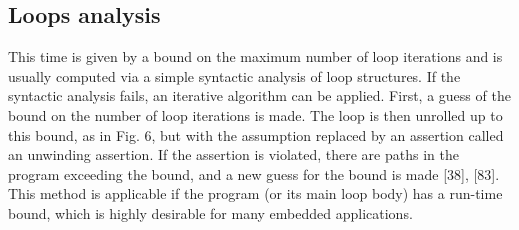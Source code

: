 \subsection{Loops analysis}
This time is given by a bound on the maximum number of loop iterations and is usually computed via a simple syntactic analysis of loop structures. If the syntactic analysis fails, an iterative algorithm can be applied. First, a guess of the bound on the number of loop iterations is made. The loop is then unrolled up to this bound, as in Fig. 6, but with the assumption replaced by an assertion called an unwinding assertion. If the assertion is violated, there are paths in the program exceeding the bound, and a new guess for the bound is made [38], [83]. This method is applicable if the program (or its main loop body) has a run-time bound, which is highly desirable for many embedded applications.